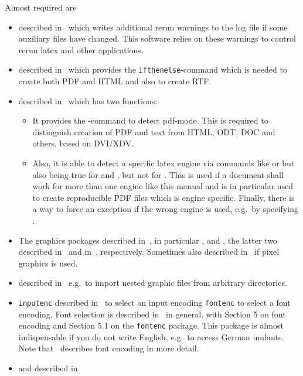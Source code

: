 \noindent
Almost required are 
%
\begin{itemize}
\item
{} described in~\cite{RerunFChkP} 
which writes additional rerun warnings to the log file 
if some auxiliary files have changed. 
This software relies on these warnings 
to control rerun latex and other applications. 
\item
{} described in~\cite{IfThenP} 
which provides the \texttt{ifthenelse}-command 
which is needed to create both PDF and HTML and also to create RTF. 
\item
{} described in~\cite{IfTeXP} which has two functions: 
\begin{itemize}
  \item 
  It provides the -command to detect pdf-mode. 
  This is required to distinguish creation of PDF and text 
  from HTML, ODT, DOC and others, based on DVI/XDV. 
  \item 
  Also, it is able to detect a specific latex engine via commands 
  like  or  but also  
  being true for \lualatex{} and \xelatex{}, but not for \pdflatex. 
  This is used if a document shall work for more than one engine 
  like this manual and is in particular used to create reproducible PDF files 
  which is engine specific. 
  Finally, there is a way to force an exception if the wrong engine is used, 
  e.g.~by specifying . 
\end{itemize}
\item
The graphics packages described in~\cite{GraX}, 
in particular ,  and , 
the latter two described in~\cite{XColorP} and in~\cite{TransP}, 
respectively. 
Sometimes also  described in~\cite{BmpP} 
if pixel graphics is used. 
\item
{} described in~\cite{ImpoP} 
e.g.~to import nested graphic files from arbitrary directories. 
\item
\texttt{inputenc} described in~\cite{InputencP} 
to select an input encoding 
\texttt{fontenc} to select a font encoding. 
Font selection is described in~\cite{FontSel} in general, 
with Section 5 on font encoding and 
Section 5.1 on the \texttt{fontenc} package. 
This package is almost indispensable if you do not write English, 
e.g.~to access German umlauts. 
Note that~\cite{FontEnc} describes font encoding in more detail. 
\item 
{} and  described in~\cite{MkidxShIdxP} 

\end{itemize}
